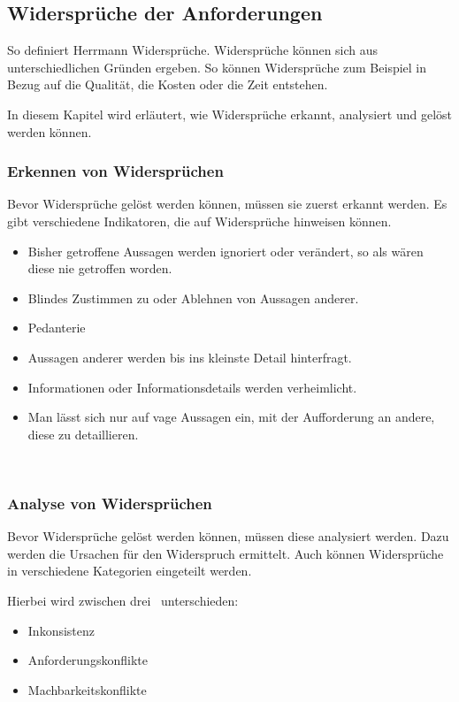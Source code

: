 \subsection{Widersprüche der Anforderungen}\label{subsec:widersprueche}
\autocite[][S.233]{Herrmann.2022}
So definiert Herrmann Widersprüche.
Widersprüche können sich aus unterschiedlichen Gründen ergeben.
So können Widersprüche zum Beispiel in Bezug auf die Qualität, die Kosten oder die Zeit entstehen.

In diesem Kapitel wird erläutert, wie Widersprüche erkannt, analysiert und gelöst werden können.

\subsubsection{Erkennen von Widersprüchen}\label{subsubsec:erkennung}
Bevor Widersprüche gelöst werden können, müssen sie zuerst erkannt werden.
Es gibt verschiedene Indikatoren, die auf Widersprüche hinweisen können.
\begin{itemize}
    \item Bisher getroffene Aussagen werden ignoriert oder verändert, so als wären diese nie getroffen worden.
    \item Blindes Zustimmen zu oder Ablehnen von Aussagen anderer.
    \item Pedanterie
    \item Aussagen anderer werden bis ins kleinste Detail hinterfragt.
    \item Informationen oder Informationsdetails werden verheimlicht.
    \item Man lässt sich nur auf vage Aussagen ein, mit der Aufforderung an andere, diese zu detaillieren.
\end{itemize}~\autocite[vgl.][S.43]{OliverCreighton.2012}

\subsubsection{Analyse von Widersprüchen}\label{subsubsec:analyse}
Bevor Widersprüche gelöst werden können, müssen diese analysiert werden.
Dazu werden die Ursachen für den Widerspruch ermittelt.
Auch können Widersprüche in verschiedene Kategorien eingeteilt werden.

Hierbei wird zwischen drei~ unterschieden:
\begin{itemize}
    \item Inkonsistenz
    \item Anforderungskonflikte
    \item Machbarkeitskonflikte
\end{itemize}~\autocite[vgl.][S.235f]{OliverCreighton.2012}

